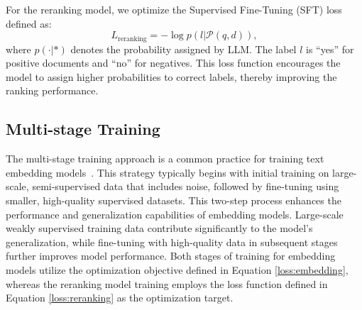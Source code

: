 For the reranking model, we optimize the Supervised Fine-Tuning (SFT) loss defined as:
\begin{equation}
\label{loss:reranking}
        L_\textrm{reranking} = -\log p(l|\mathcal{P}(q,d)),
\end{equation}
where $p(\cdot|*)$ denotes the probability assigned by LLM. The label $l$ is ``yes'' for positive documents and ``no'' for negatives. This loss function encourages the model to assign higher probabilities to correct labels, thereby improving the ranking performance.

\subsection{Multi-stage Training}
The multi-stage training approach is a common practice for training text embedding models~\citep{li2023generaltextembeddingsmultistage,wang2024textembeddingsweaklysupervisedcontrastive,chen-etal-2024-m3}. This strategy typically begins with initial training on large-scale, semi-supervised data that includes noise, followed by fine-tuning using smaller, high-quality supervised datasets. This two-step process enhances the performance and generalization capabilities of embedding models. Large-scale weakly supervised training data contribute significantly to the model's generalization, while fine-tuning with high-quality data in subsequent stages further improves model performance. Both stages of training for embedding models utilize the optimization objective defined in Equation \ref{loss:embedding}, whereas the reranking model training employs the loss function defined in Equation \ref{loss:reranking} as the optimization target.

